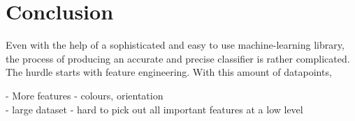 \chapter{Conclusion}
Even with the help of a sophisticated and easy to use machine-learning library, the process of producing an accurate and precise classifier is rather complicated. The hurdle starts with feature engineering. With this amount of datapoints,

- More features - colours, orientation \\
- large dataset - hard to pick out all important features at a low level
